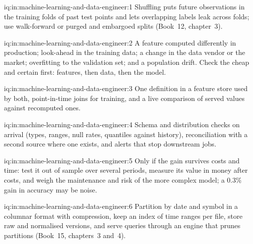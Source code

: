 \begin{solution}{iq:in:machine-learning-and-data-engineer:1}
Shuffling puts future observations in the training folds of past test points and lets overlapping labels leak across
folds; use walk-forward or purged and embargoed splits (Book~12, chapter~3).
\end{solution}

\begin{solution}{iq:in:machine-learning-and-data-engineer:2}
A feature computed differently in production; look-ahead in the training data; a change in the data vendor or the market;
overfitting to the validation set; and a population drift. Check the cheap and certain first: features, then data, then
the model.
\end{solution}

\begin{solution}{iq:in:machine-learning-and-data-engineer:3}
One definition in a feature store used by both, point-in-time joins for training, and a live comparison of served values
against recomputed ones.
\end{solution}

\begin{solution}{iq:in:machine-learning-and-data-engineer:4}
Schema and distribution checks on arrival (types, ranges, null rates, quantiles against history), reconciliation with a
second source where one exists, and alerts that stop downstream jobs.
\end{solution}

\begin{solution}{iq:in:machine-learning-and-data-engineer:5}
Only if the gain survives costs and time: test it out of sample over several periods, measure its value in money after
costs, and weigh the maintenance and risk of the more complex model; a 0.3\% gain in accuracy may be noise.
\end{solution}

\begin{solution}{iq:in:machine-learning-and-data-engineer:6}
Partition by date and symbol in a columnar format with compression, keep an index of time ranges per file, store raw and
normalised versions, and serve queries through an engine that prunes partitions (Book~15, chapters~3 and~4).
\end{solution}
